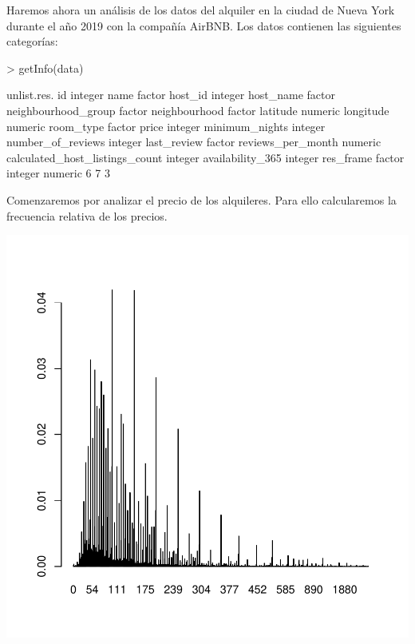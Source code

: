 \documentclass [a4paper] {article}
\begin{document}
Haremos ahora un análisis de los datos del alquiler en la ciudad de Nueva York durante el año 2019 con la compañía AirBNB.
Los datos contienen las siguientes categorías:
\begin{Schunk}
\begin{Sinput}
> getInfo(data)
\end{Sinput}
\begin{Soutput}
                               unlist.res.
id                                 integer
name                                factor
host_id                            integer
host_name                           factor
neighbourhood_group                 factor
neighbourhood                       factor
latitude                           numeric
longitude                          numeric
room_type                           factor
price                              integer
minimum_nights                     integer
number_of_reviews                  integer
last_review                         factor
reviews_per_month                  numeric
calculated_host_listings_count     integer
availability_365                   integer
res_frame
 factor integer numeric 
      6       7       3 
\end{Soutput}
\end{Schunk}
Comenzaremos por analizar el precio de los alquileres.
Para ello calcularemos la frecuencia relativa de los precios.
\begin{Schunk}
\end{Schunk}
\begin{center}
\includegraphics{entrega-frecuencia_relativa_BNB_plot}
\end{center}
\end{document}
